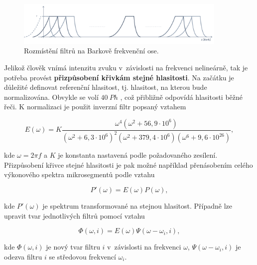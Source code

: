 \begin{figure}[hbpt]
  \centering
  \includegraphics[width=0.9\textwidth]{./ch4-asr/img/plp-bank.pdf}
  \caption{Rozmístění filtrů na Barkově frekvenční ose.}
  \label{fig:asr:plp:bank}
\end{figure}

Jelikož člověk vnímá intenzitu zvuku v~závislosti na frekvenci nelineárně, tak je potřeba provést \textbf{přizpůsobení křivkám stejné hlasitosti}.
Na začátku je důležité definovat referenční hlasitost, tj. hlasitost, na kterou bude normalizována.
Obvykle se volí $40\ Ph$ \cite{Psutka2006}, což přibližně odpovídá hlasitosti běžné řeči. K normalizaci je použit inverzní filtr popsaný vztahem

\begin{equation}
  E\left(\omega\right) = K \frac{\omega^4\left(\omega^2 + 56,9 \cdot 10^6\right)}{\left(\omega^2 + 6,3 \cdot 10^6\right)^2\left(\omega^2 + 379,4 \cdot 10^6\right)\left(\omega^6 + 9,6 \cdot 10^{26}\right)},
  \label{eq:asr:plp:filter}
\end{equation}

\noindent kde $\omega = 2\pi f$ a $K$ je konstanta nastavená podle požadovaného zesílení. Přizpůsobení křivce stejné hlasitosti je pak možné například přenásobením celého výkonového spektra mikrosegmentů podle vztahu

\begin{equation}
  P'\left(\omega\right) = E\left(\omega\right)P\left(\omega\right),
  \label{eq:asr:plp:filter:application1}
\end{equation}

\noindent kde $P'\left(\omega\right)$ je spektrum transformované na stejnou hlasitost. Případně lze upravit tvar jednotlivých filtrů pomocí vztahu

\begin{equation}
  \Phi\left(\omega, i\right) = E\left(\omega\right)\Psi\left(\omega - \omega_i, i\right),
  \label{eq:asr:plp:filter:application2}
\end{equation}

\noindent kde $\Phi\left(\omega, i\right)$ je nový tvar filtru $i$ v~závislosti na frekvenci $\omega$, $\Psi\left(\omega - \omega_i, i\right)$ je odezva filtru $i$ se středovou frekvencí $\omega_i$.

